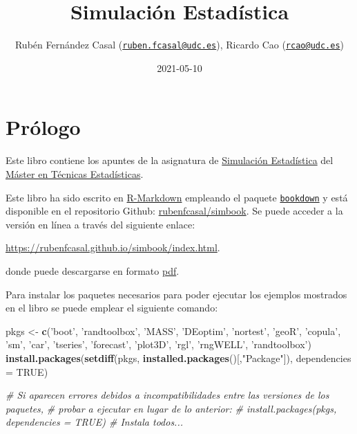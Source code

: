 \documentclass[
]{book}
\title{Simulación Estadística}
\author{Rubén Fernández Casal (\href{mailto:ruben.fcasal@udc.es}{\nolinkurl{ruben.fcasal@udc.es}}), Ricardo Cao (\href{mailto:rcao@udc.es}{\nolinkurl{rcao@udc.es}})}
\date{2021-05-10}
\newenvironment{Shaded}{\begin{snugshade}}{\end{snugshade}}
\newcommand{\CommentTok}[1]{\textcolor[rgb]{0.56,0.35,0.01}{\textit{#1}}}
\newcommand{\DataTypeTok}[1]{\textcolor[rgb]{0.13,0.29,0.53}{#1}}
\newcommand{\KeywordTok}[1]{\textcolor[rgb]{0.13,0.29,0.53}{\textbf{#1}}}
\newcommand{\NormalTok}[1]{#1}
\newcommand{\OtherTok}[1]{\textcolor[rgb]{0.56,0.35,0.01}{#1}}
\newcommand{\StringTok}[1]{\textcolor[rgb]{0.31,0.60,0.02}{#1}}
\theoremstyle{break}
\theoremstyle{definition}
\theoremstyle{definition}
\theoremstyle{definition}
\theoremstyle{remark}
\begin{document}
\maketitle

{
\setcounter{tocdepth}{1}
\tableofcontents
}
\hypertarget{pruxf3logo}{%
\chapter*{Prólogo}\label{pruxf3logo}}

Este libro contiene los apuntes de la asignatura de \href{http://eamo.usc.es/pub/mte/index.php/es/?option=com_content\&view=article\&id=2201\&idm=13\&a\%C3\%B1o=2019}{Simulación Estadística} del \href{http://eio.usc.es/pub/mte}{Máster en Técnicas Estadísticas}.

Este libro ha sido escrito en \href{http://rmarkdown.rstudio.com}{R-Markdown} empleando el paquete \href{https://bookdown.org/yihui/bookdown/}{\texttt{bookdown}} y está disponible en el repositorio Github: \href{https://github.com/rubenfcasal/simbook}{rubenfcasal/simbook}.
Se puede acceder a la versión en línea a través del siguiente enlace:

\url{https://rubenfcasal.github.io/simbook/index.html}.

donde puede descargarse en formato \href{https://rubenfcasal.github.io/simbook/Simulacion.pdf}{pdf}.

Para instalar los paquetes necesarios para poder ejecutar los ejemplos mostrados en el libro se puede emplear el siguiente comando:

\begin{Shaded}
\begin{Highlighting}[]
\NormalTok{pkgs <-}\StringTok{ }\KeywordTok{c}\NormalTok{(}\StringTok{'boot'}\NormalTok{, }\StringTok{'randtoolbox'}\NormalTok{, }\StringTok{'MASS'}\NormalTok{, }\StringTok{'DEoptim'}\NormalTok{, }\StringTok{'nortest'}\NormalTok{, }\StringTok{'geoR'}\NormalTok{, }\StringTok{'copula'}\NormalTok{, }\StringTok{'sm'}\NormalTok{,}
          \StringTok{'car'}\NormalTok{, }\StringTok{'tseries'}\NormalTok{, }\StringTok{'forecast'}\NormalTok{, }\StringTok{'plot3D'}\NormalTok{, }\StringTok{'rgl'}\NormalTok{, }\StringTok{'rngWELL'}\NormalTok{, }\StringTok{'randtoolbox'}\NormalTok{)}
\KeywordTok{install.packages}\NormalTok{(}\KeywordTok{setdiff}\NormalTok{(pkgs, }\KeywordTok{installed.packages}\NormalTok{()[,}\StringTok{"Package"}\NormalTok{]), }
                 \DataTypeTok{dependencies =} \OtherTok{TRUE}\NormalTok{)}

\CommentTok{# Si aparecen errores debidos a incompatibilidades entre las versiones de los paquetes, }
\CommentTok{# probar a ejecutar en lugar de lo anterior:}
\CommentTok{# install.packages(pkgs, dependencies = TRUE) # Instala todos...}
\end{Highlighting}
\end{Shaded}
\end{document}
